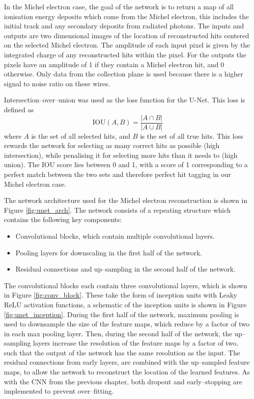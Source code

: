 In the Michel electron case, the goal of the network is to return a map of all
ionisation energy deposits which come from the Michel electron, this includes
the initial track and any secondary deposits from radiated photons. The inputs
and outputs are two dimensional images of the location of reconstructed hits
centered on the selected Michel electron. The amplitude of each input pixel is 
given by the integrated charge of any reconstructed hits within the pixel. For
the outputs the pixels have an amplitude of 1 if they contain a Michel electron
hit, and 0 otherwise. Only data from the collection plane is used because there 
is a higher signal to noise ratio on these wires. 

Intersection--over--union was used as the loss function for the U-Net. This loss
is defined as 
\begin{equation}
	\mbox{IOU}(A, B) = \frac{|A \cap B|}{|A \cup B|}
\end{equation}
where $A$ is the set of all selected hits, and $B$ is the set of all true 
hits\cite{rezatofighi2019generalized}. This loss rewards the network for 
selecting as many correct hits as possible (high intersection), while 
penalising it for selecting more hits than it needs to (high union). The IOU 
score lies between 0 and 1, with a score of 1 corresponding to a perfect match 
between the two sets and therefore perfect hit tagging in our Michel electron 
case.

The network architecture used for the Michel electron reconstruction is shown in
Figure \ref{fig:unet_arch}. The network consists of a repeating structure which
contains the following key components:
\begin{itemize}
	\item Convolutional blocks, which contain multiple convolutional layers.
	\item Pooling layers for downscaling in the first half of the network.
	\item Residual connections and up--sampling in the second half of the network.
\end{itemize}
The convolutional blocks each contain three convolutional layers, which is 
shown in Figure \ref{fig:conv_block}. These take the form of inception 
units\cite{Szegedy2015} with Leaky ReLU activation functions, a schematic of 
the inception units is shown in Figure \ref{fig:unet_inception}. During the 
first half of the network, maximum pooling is used to downsample the size of 
the feature maps, which reduce by a factor of two in each max pooling layer. 
Then, during the second half of the network, the up--sampling layers increase 
the resolution of the feature maps by a factor of two, such that the output of 
the network has the same resolution as the input.  The residual connections 
from early layers, are combined with the up--sampled feature maps, to allow 
the network to reconstruct the location of the learned features. As with the 
CNN from the previous chapter, both dropout and early--stopping are 
implemented to prevent over--fitting.

